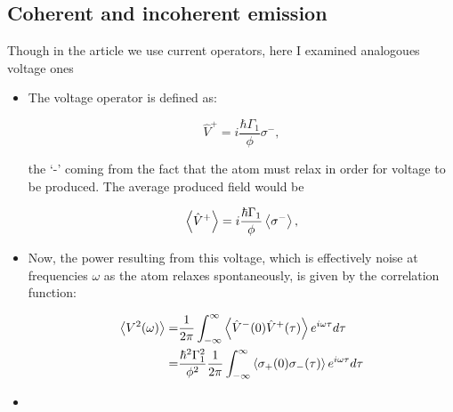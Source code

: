  \subsection{Coherent and incoherent emission}
  Though in the article we use current operators, here I examined analogoues voltage ones
  \begin{itemize}
  \item The voltage operator is defined as:
  
  \begin{equation}\label{feb22018}
    \hat{V}^{+} = i\frac{\hbar\Gamma_1}{\phi}\sigma^{-},
  \end{equation}
  
  \noindent the `-' coming from  the fact that the atom must relax in  order for voltage to be
  produced. The average produced field would be
  
  \[
    \left\langle \hat{V}^{+} \right\rangle = i\frac{\hbar\Gamma_1}{\phi}\left\langle \sigma^{-} \right\rangle,
  \]
  
\item Now, the  power resulting from this  voltage, which is effectively  noise at frequencies
  $ \omega $ as the atom relaxes spontaneously, is given by the correlation function:
  
  \begin{equation}\label{feb22018:1}
    \begin{aligned}
      \left\langle V^2(\omega) \right\rangle = & \frac{1}{2\pi}\int_{-\infty}^{\infty}\left\langle \hat{V}^{-}(0)\hat{V}^{+}(\tau) \right\rangle e^{i\omega \tau}d\tau\\
      =                                                                                      &
      \frac{\hbar^2\Gamma_1^{2}}{\phi^2}\frac{1}{2\pi}\int_{-\infty}^{\infty}\left\langle \sigma_{+}(0)\sigma_{-}(\tau) \right\rangle e^{i\omega
        \tau}d\tau
    \end{aligned}
  \end{equation}
  
\item   {}
  

\end{itemize}
